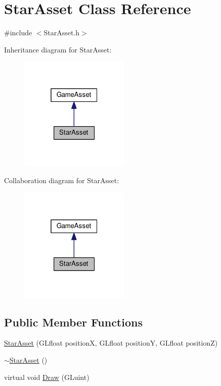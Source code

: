 \hypertarget{classStarAsset}{}\section{Star\+Asset Class Reference}
\label{classStarAsset}


{\ttfamily \#include $<$Star\+Asset.\+h$>$}



Inheritance diagram for Star\+Asset\+:
\nopagebreak
\begin{figure}[H]
\begin{center}
\leavevmode
\includegraphics[width=148pt]{classStarAsset__inherit__graph}
\end{center}
\end{figure}


Collaboration diagram for Star\+Asset\+:
\nopagebreak
\begin{figure}[H]
\begin{center}
\leavevmode
\includegraphics[width=148pt]{classStarAsset__coll__graph}
\end{center}
\end{figure}
\subsection*{Public Member Functions}
\begin{DoxyCompactItemize}
\item 
\hyperlink{classStarAsset_aa97b2aacfe7fba0f042076a045b96c43}{Star\+Asset} (G\+Lfloat position\+X, G\+Lfloat position\+Y, G\+Lfloat position\+Z)
\item 
\hyperlink{classStarAsset_a77a07269f87ab84c206d1bc5733e0a10}{$\sim$\+Star\+Asset} ()
\item 
virtual void \hyperlink{classStarAsset_a1e44c9446a0443f8f7fdddf9fb74b8d7}{Draw} (G\+Luint)
\end{DoxyCompactItemize}



